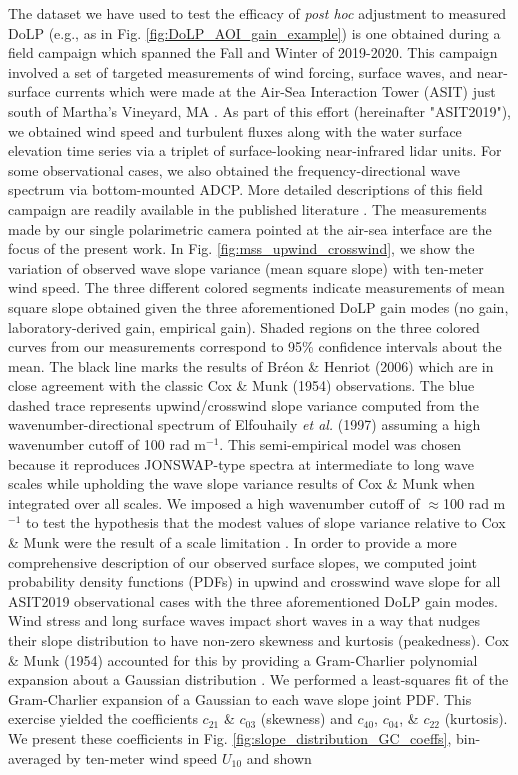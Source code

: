 \documentclass[letterpaper,draftcls,onecolumn]{IEEEtran}
\begin{document}
The dataset we have used to test the efficacy of \emph{post hoc} adjustment to measured DoLP (e.g., as in Fig. \ref{fig:DoLP_AOI_gain_example}) is one obtained during a field campaign which spanned the Fall and Winter of 2019-2020. This campaign involved a set of targeted measurements of wind forcing, surface waves, and near-surface currents which were made at the Air-Sea Interaction Tower (ASIT) just south of Martha's Vineyard, MA \cite{laxague_effects_2025}. As part of this effort (hereinafter "ASIT2019"), we obtained wind speed and turbulent fluxes along with the water surface elevation time series via a triplet of surface-looking near-infrared lidar units. For some observational cases, we also obtained the frequency-directional wave spectrum via bottom-mounted ADCP. More detailed descriptions of this field campaign are readily available in the published literature \cite{cifuenteslorenzen_exploring_2024,hogan_observations_2025}. The measurements made by our single polarimetric camera pointed at the air-sea interface \cite{laxague_effects_2025} are the focus of the present work. In Fig. \ref{fig:mss_upwind_crosswind}, we show the variation of observed wave slope variance (mean square slope) with ten-meter wind speed. The three different colored segments indicate measurements of mean square slope obtained given the three aforementioned DoLP gain modes (no gain, laboratory-derived gain, empirical gain). Shaded regions on the three colored curves from our measurements correspond to 95\% confidence intervals about the mean. The black line marks the results of Br\'eon \& Henriot (2006) \cite{Breon2006} which are in close agreement with the classic Cox \& Munk (1954) \cite{Cox1954a} observations. The blue dashed trace represents upwind/crosswind slope variance computed from the wavenumber-directional spectrum of Elfouhaily \emph{et al.} (1997) assuming a high wavenumber cutoff of 100 rad m$^{-1}$. This semi-empirical model \cite{Elfouhaily1997} was chosen because it reproduces JONSWAP-type spectra \cite{Hasselmann1973} at intermediate to long wave scales while upholding the wave slope variance results of Cox \& Munk \cite{Cox1954a} when integrated over all scales. We imposed a high wavenumber cutoff of $\approx$100 rad m$^{-1}$ to test the hypothesis that the modest values of slope variance relative to Cox \& Munk were the result of a scale limitation \cite{laxague_effects_2025}. In order to provide a more comprehensive description of our observed surface slopes, we computed joint probability density functions (PDFs) in upwind and crosswind wave slope for all ASIT2019 observational cases with the three aforementioned DoLP gain modes. Wind stress and long surface waves impact short waves in a way that nudges their slope distribution to have non-zero skewness and kurtosis (peakedness). Cox \& Munk (1954) accounted for this by providing a Gram-Charlier polynomial expansion about a Gaussian distribution \cite{Cox1954a}. We performed a least-squares fit of the Gram-Charlier expansion of a Gaussian to each wave slope joint PDF. This exercise yielded the coefficients $c_{21}$ \& $c_{03}$ (skewness) and $c_{40}$, $c_{04}$, \& $c_{22}$ (kurtosis). We present these coefficients in Fig. \ref{fig:slope_distribution_GC_coeffs}, bin-averaged by ten-meter wind speed $U_{10}$ and shown 
\end{document}
